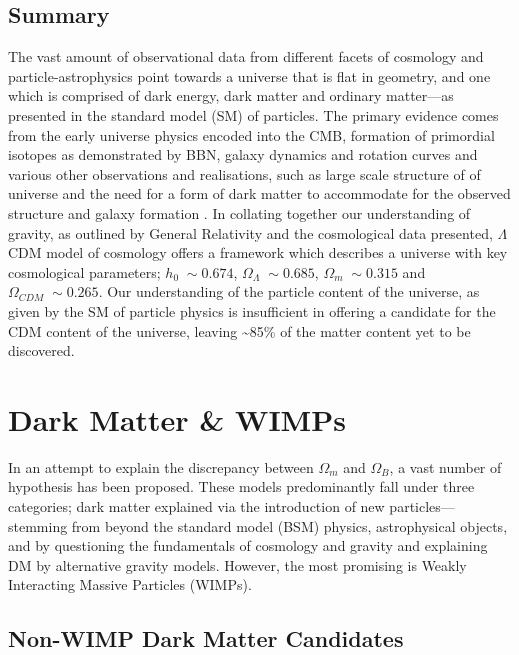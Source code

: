 \subsection{Summary}
\label{subsec:evidence_summary}

The vast amount of observational data from different facets of cosmology and particle-astrophysics point towards a universe that is flat in geometry, and one which is comprised of dark energy, dark matter and ordinary matter---as presented in the standard model (SM) of particles. The primary evidence comes from the early universe physics encoded into the CMB, formation of primordial isotopes as demonstrated by BBN, galaxy dynamics and rotation curves and various other observations and realisations, such as large scale structure of of universe and the need for a form of dark matter to accommodate for the observed structure and galaxy formation \cite{LSS_coles}. In collating together our understanding of gravity, as outlined by General Relativity and the cosmological data presented, $\Lambda$CDM model of cosmology offers a framework which describes a universe with key cosmological parameters; $h_0 \; \sim0.674$, $\Omega_{\Lambda} \; \sim0.685$, $\Omega_{m} \; \sim0.315$  and $\Omega_{CDM} \; \sim0.265$. Our understanding of the particle content of the universe, as given by the SM of particle physics is insufficient in offering a candidate for the CDM content of the universe, leaving \sim 85\% of the matter content yet to be discovered.


\section{Dark Matter \& WIMPs}
\label{sec:candidates}

In an attempt to explain the discrepancy between $\Omega_{m}$ and $\Omega_{B}$, a vast number of hypothesis has been proposed. These models predominantly fall under three categories; dark matter explained via the introduction of new particles---stemming from beyond the standard model (BSM) physics, astrophysical objects, and by questioning the fundamentals of cosmology and gravity and explaining DM by alternative gravity models. However, the most promising is Weakly Interacting Massive Particles (WIMPs). 

\subsection{Non-WIMP Dark Matter Candidates}
\label{subsec:non_wimp_dm}

